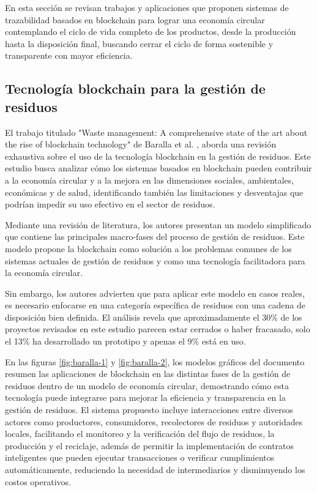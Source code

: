 \documentclass[main.tex]{subfiles}
\begin{document}
En esta sección se revisan trabajos y aplicaciones que proponen sistemas de trazabilidad basados en blockchain para lograr una economía circular contemplando el ciclo de vida completo de los productos, desde la producción hasta la disposición final, buscando cerrar el ciclo de forma sostenible y transparente con mayor eficiencia.

\subsection{Tecnología blockchain para la gestión de residuos}

El trabajo titulado "Waste management: A comprehensive state of the art about the rise of blockchain technology" de Baralla et al. \cite{baralla2023waste}, aborda una revisión exhaustiva sobre el uso de la tecnología blockchain en la gestión de residuos. Este estudio busca analizar cómo los sistemas basados en blockchain pueden contribuir a la economía circular y a la mejora en las dimensiones sociales, ambientales, económicas y de salud, identificando también las limitaciones y desventajas que podrían impedir su uso efectivo en el sector de residuos.

Mediante una revisión de literatura, los autores presentan un modelo simplificado que contiene las principales macro-fases del proceso de gestión de residuos. Este modelo propone la blockchain como solución a los problemas comunes de los sistemas actuales de gestión de residuos y como una tecnología facilitadora para la economía circular. 

Sin embargo, los autores advierten que para aplicar este modelo en casos reales, es necesario enfocarse en una categoría específica de residuos con una cadena de disposición bien definida. El análisis revela que aproximadamente el 30\% de los proyectos revisados en este estudio parecen estar cerrados o haber fracasado, solo el 13\% ha desarrollado un prototipo y apenas el 9\% está en uso.

En las figuras \ref{fig:baralla-1} y \ref{fig:baralla-2}, los modelos gráficos del documento resumen las aplicaciones de blockchain en las distintas fases de la gestión de residuos dentro de un modelo de economía circular, demostrando cómo esta tecnología puede integrarse para mejorar la eficiencia y transparencia en la gestión de residuos. El sistema propuesto incluye interacciones entre diversos actores como productores, consumidores, recolectores de residuos y autoridades locales, facilitando el monitoreo y la verificación del flujo de residuos, la producción y el reciclaje, además de permitir la implementación de contratos inteligentes que pueden ejecutar transacciones o verificar cumplimientos automáticamente, reduciendo la necesidad de intermediarios y disminuyendo los costos operativos.
\end{document}
